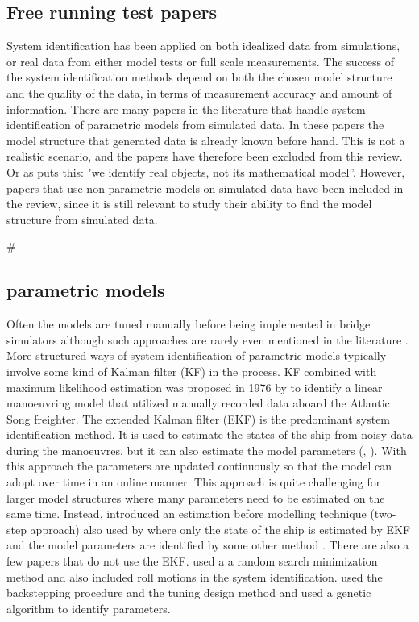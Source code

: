 \subsection{Free running test papers}
System identification has been applied on both idealized data from simulations, or real data from either model tests or full scale measurements. The success of the system identification methods depend on both the chosen model structure and the quality of the data, in terms of measurement accuracy and amount of information. 
There are many papers in the literature that handle system identification of parametric models from simulated data. 
In these papers the model structure that generated data is already known before hand. This is not a realistic scenario, and the papers have therefore been excluded from this review. Or as \cite{millerShipModelIdentification2021} puts this: "we identify real objects, not its mathematical model”. However, papers that use non-parametric models on simulated data have been included in the review, since it is still relevant to study their ability to find the model structure from simulated data.

#\subsection{parametric models}
Often the models are tuned manually before being implemented in bridge simulators although such approaches are rarely even mentioned in the literature \cite{sutuloAlgorithmOfflineIdentification2014}. More structured ways of system identification of parametric models typically involve some kind of Kalman filter (KF) in the process. KF combined with maximum likelihood estimation was proposed in 1976 by \cite{astromIdentificationShipSteering1976} to identify a linear manoeuvring model that utilized manually recorded data aboard the Atlantic Song freighter. The extended Kalman filter (EKF) is the predominant system identification method. It is used to estimate the states of the ship from noisy data during the manoeuvres, but it can also estimate the model parameters (\cite{shiIdentificationShipManeuvering2009}, \cite{pereraSystemIdentificationNonlinear2015}). With this approach the parameters are updated continuously so that the model can adopt over time in an online manner. This approach is quite challenging for larger model structures where many parameters need to be estimated on the same time. Instead, \cite{yoonIdentificationHydrodynamicCoefficients2003} introduced an estimation before modelling technique  (two-step approach) also used by \cite{revestidoherreroTwostepIdentificationNonlinear2012} where only the state of the ship is estimated by EKF and the model parameters are identified by some other method .  
There are also a few papers that do not use the EKF. \cite{tianoMultivariableIdentificationShip1997} used a a random search minimization method and also included roll motions in the system identification. \cite{casadoIdentificationNonlinearShip2005} used the backstepping procedure and the tuning design method and \cite{millerShipModelIdentification2021} used a genetic algorithm   to identify parameters.

